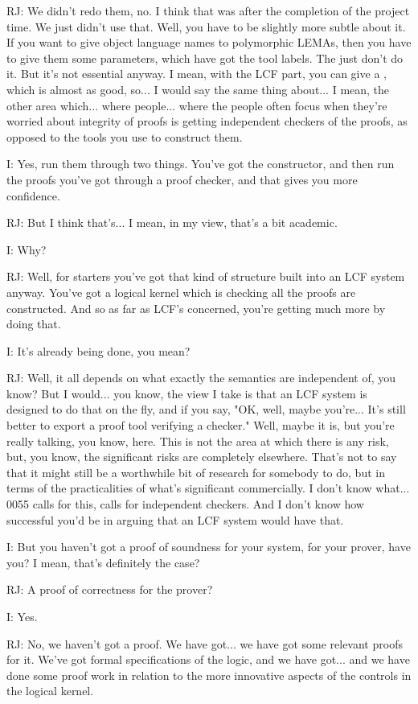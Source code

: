\documentclass[10pt,titlepage]{book}
\begin{document}
RJ: We didn't redo them, no. I think that was after the completion of the project	time. We just didn't use that. Well, you have to be slightly more subtle about it. If you want to give object language names to polymorphic LEMAs, then you have to give them some parameters, which have got the tool labels. The	just don't do it. But it's not essential anyway. I mean, with the LCF part, you can give a	, which is almost as good, so... I would say the same thing about... I mean, the other area which... where people... where the people often focus when they're worried about integrity of proofs is getting independent checkers of the proofs, as opposed to the tools you use to construct them.

I: Yes, run them through two things. You've got the constructor, and then run the proofs you've got through a proof checker, and that gives you more confidence.

RJ: But I think that's... I mean, in my view, that's a bit academic.

I: Why?

RJ: Well, for starters you've got that kind of structure built into an LCF system anyway. You've got a logical kernel which is checking all the proofs are constructed. And so as far as LCF's concerned, you're getting much more by doing that.

I: It's already being done, you mean?

RJ: Well, it all depends on what exactly the semantics are independent of, you know? But I would... you know, the view I take is that an LCF system is designed to do that on the fly, and if you say, "OK, well, maybe you're... It's still better to export a proof tool verifying a checker." Well, maybe it is, but you're really talking, you know,	here. This is not the area at which there is any risk, but, you know, the significant risks are completely elsewhere. That's not to say that it might still be a worthwhile bit of research for somebody to do, but in terms of the practicalities of what's significant commercially. I don't know what... 0055 calls for this, calls for independent checkers. And I don't know how successful you'd be in arguing that an LCF system would have that.

I: But you haven't got a proof of soundness for your system, for your prover, have you? I mean, that's definitely the case?

RJ: A proof of correctness for the prover?

I: Yes.

RJ: No, we haven't got a proof. We have got... we have got some relevant proofs for it. We've got formal specifications of the logic, and we have got... and we have done some proof work in relation to the more innovative aspects of the controls in the logical kernel.
\end{document}
